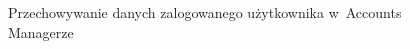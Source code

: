 \documentclass[12pt,a4paper,twoside,titlepage,openright]{book}
\begin{document}
\begin{figure}[h]
\begin{minipage}[t]{0.3\textwidth}
		\caption{Przechowywanie danych zalogowanego użytkownika w~Accounts Managerze}
		\label{fig:app-accountsManager}
	\end{minipage}
\end{figure}
\end{document}
